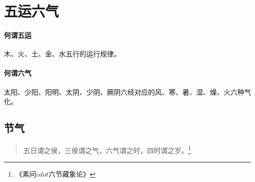 \section{五运六气}

\paragraph{何谓五运}
木、火、土、金、水五行的运行规律。

\paragraph{何谓六气}
太阳、少阳、阳明、太阴、少阴、厥阴六经对应的风、寒、暑、湿、燥、火六种气化。

\subsection{节气}
\begin{quote}
  五日谓之侯，三侯谓之气，六气谓之时，四时谓之岁。\footnote{《素问$cdot$六节藏象论》}
\end{quote}
